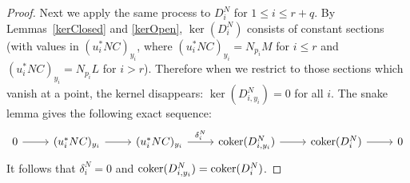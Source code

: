\begin{proposition}
\begin{proof}
Next we apply the same process to $D_i^N$ for $1 \leq i \leq r+q$. By Lemmas~\ref{kerClosed} and \ref{kerOpen}, $\ker(D_i^N)$ consists of constant sections (with values in $(u_i^*NC)_{y_i}$, where $(u_i^*NC)_{y_i}=N_{p_i}M$ for $i \leq r$ and $(u_i^*NC)_{y_i}=N_{p_i}L$ for $i>r$). Therefore when we restrict to those sections which vanish at a point, the kernel disappears: $\ker(D_{i,y_i}^N)=0$ for all $i$. The snake lemma gives the following exact sequence:
\begin{equation}
\begin{tikzcd}
0 \arrow[r] & (u_i^*NC)_{y_i} \arrow[r] &(u_i^*NC)_{y_i} \arrow[r, "\delta_i^N"] & \coker(D_{i,y_i}^N) \arrow[r] & \coker(D_i^N) \arrow[r] & 0
\end{tikzcd}
\label{snakeiN}
\end{equation}
It follows that $\delta_i^N=0$ and $\operatorname{coker}(D_{i,y_i}^N)=\operatorname{coker}(D_i^N)$.


\end{proof}
\end{proposition}
